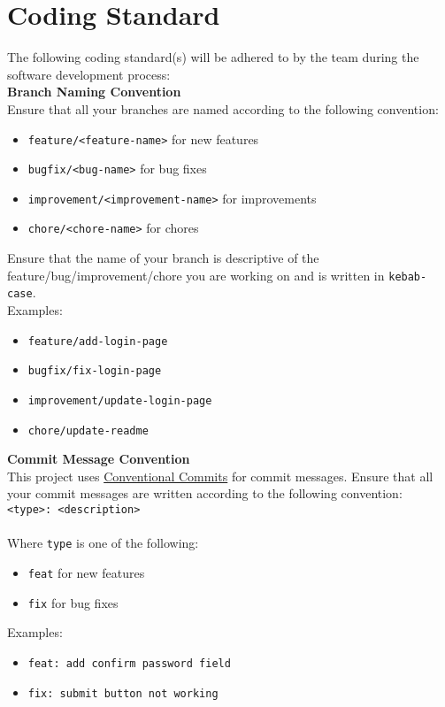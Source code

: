 \documentclass{article}
\begin{document}
\section{Coding Standard}

The following coding standard(s) will be adhered to by the team during the software development process: \\

\noindent \textbf{Branch Naming Convention} \\
Ensure that all your branches are named according to the following convention:
\begin{itemize}
\item \texttt{feature/<feature-name>} for new features
\item \texttt{bugfix/<bug-name>} for bug fixes
\item \texttt{improvement/<improvement-name>} for improvements
\item \texttt{chore/<chore-name>} for chores
\end{itemize}

\noindent Ensure that the name of your branch is descriptive of the feature/bug/improvement/chore you are working on and is written in \texttt{kebab-case}. \\
Examples:
\begin{itemize}
\item \texttt{feature/add-login-page}
\item \texttt{bugfix/fix-login-page}
\item \texttt{improvement/update-login-page}
\item \texttt{chore/update-readme} \\
\end{itemize}

\noindent \textbf{Commit Message Convention} \\
This project uses \href{https://www.conventionalcommits.org/en/v1.0.0/}{Conventional Commits} for commit messages.
Ensure that all your commit messages are written according to the following convention: \\
\texttt{<type>: <description>} \\ \\
Where \texttt{type} is one of the following:
\begin{itemize}
\item \texttt{feat} for new features
\item \texttt{fix} for bug fixes
\end{itemize}
Examples:
\begin{itemize}
\item \texttt{feat: add confirm password field}
\item \texttt{fix: submit button not working} \\
\end{itemize}
\end{document}
